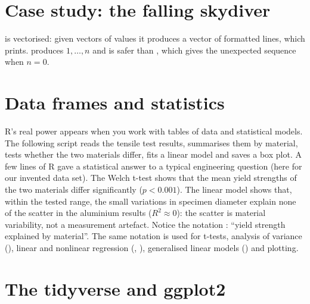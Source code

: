 \section{Case study: the falling skydiver}

 is vectorised: given vectors of values it produces a vector of formatted
lines, which  prints.  produces $1, \ldots, n$ and is safer than
, which gives the unexpected sequence  when $n = 0$.

\section{Data frames and statistics}

R's real power appears when you work with tables of data and statistical models. The
following script reads the tensile test results, summarises them by material, tests
whether the two materials differ, fits a linear model and saves a box plot.
A few lines of R gave a statistical answer to a typical engineering question (here for
our invented data set). The Welch
t-test shows that the mean yield strengths of the two materials differ significantly
($p < 0.001$). The linear model shows that, within the tested range, the small variations
in specimen diameter explain none of the scatter in the aluminium results ($R^2 \approx 0$):
the scatter is material variability, not a measurement artefact. Notice the
 notation : ``yield strength
explained by material''. The same notation is used for t-tests, analysis of variance
(), linear and nonlinear regression (, ), generalised linear
models () and plotting.

\section{The tidyverse and ggplot2}

